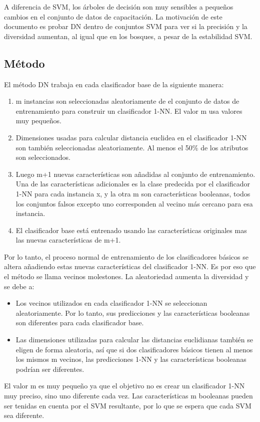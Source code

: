 A diferencia de SVM, los árboles de decisión son muy sensibles a pequeños cambios en el conjunto de datos de capacitación. La motivación de este documento es probar DN dentro de conjuntos SVM para ver si la precisión y la diversidad aumentan, al igual que en los bosques, a pesar de la estabilidad SVM. 
\subsection{Método}
El método DN trabaja en cada clasificador base de la siguiente manera:
\begin{enumerate}
    \item m instancias son seleccionadas aleatoriamente de el conjunto de datos de entrenamiento para construir un clasificador 1-NN. El valor m usa valores muy pequeños.
    \item Dimensiones usadas para calcular distancia euclidea en el clasificador 1-NN son también seleccionadas aleatoriamente. Al menos el 50\% de los atributos son seleccionados.
    \item Luego m+1 nuevas características son añadidas al conjunto de entrenamiento. Una de las características adicionales es la clase predecida por el clasificador 1-NN para cada instancia x, y la otra m son características booleanas, todos los conjuntos falsos excepto uno corresponden al vecino más cercano para esa instancia.
    \item El clasificador base está entrenado usando las características originales mas las nuevas características de m+1. 
\end{enumerate}
Por lo tanto, el proceso normal de entrenamiento de los clasificadores básicos se altera añadiendo estas nuevas características del clasificador 1-NN. Es por eso que el método se llama vecinos molestones. La aleatoriedad aumenta la diversidad y se debe a:
\begin{itemize}
\item Los vecinos utilizados en cada clasificador 1-NN se seleccionan aleatoriamente. Por lo tanto, sus predicciones y las características booleanas son diferentes para cada clasificador base.
\item Las dimensiones utilizadas para calcular las distancias euclidianas también se eligen de forma aleatoria, así que si dos clasificadores básicos tienen al menos los mismos m vecinos, las predicciones 1-NN y las características booleanas podrían ser diferentes.
\end{itemize}
El valor m es muy pequeño ya que el objetivo no es crear un clasificador 1-NN muy preciso, sino uno diferente cada vez. Las características m booleanas pueden ser tenidas en cuenta por el SVM resultante, por lo que se espera que cada SVM sea diferente.
